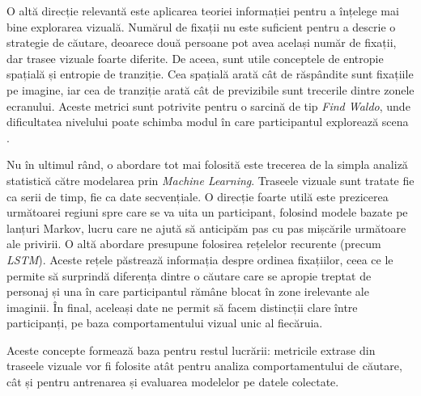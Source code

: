 O altă direcție relevantă este aplicarea teoriei informației pentru a înțelege mai bine explorarea vizuală. Numărul de fixații nu este suficient pentru a descrie o strategie de căutare, deoarece două persoane pot avea același număr de fixații, dar trasee vizuale foarte diferite. De aceea, sunt utile conceptele de entropie spațială și entropie de tranziție. Cea spațială arată cât de răspândite sunt fixațiile pe imagine, iar cea de tranziție arată cât de previzibile sunt trecerile dintre zonele ecranului. Aceste metrici sunt potrivite pentru o sarcină de tip \emph{Find Waldo}, unde dificultatea nivelului poate schimba modul în care participantul explorează scena \cite{otero2016waldo}.

Nu în ultimul rând, o abordare tot mai folosită este trecerea de la simpla analiză statistică către modelarea prin \emph{Machine Learning}. Traseele vizuale sunt tratate fie ca serii de timp, fie ca date secvențiale. O direcție foarte utilă este prezicerea următoarei regiuni spre care se va uita un participant, folosind modele bazate pe lanțuri Markov, lucru care ne ajută să anticipăm pas cu pas mișcările următoare ale privirii. O altă abordare presupune folosirea rețelelor recurente (precum \emph{LSTM}). Aceste rețele păstrează informația despre ordinea fixațiilor, ceea ce le permite să surprindă diferența dintre o căutare care se apropie treptat de personaj și una în care participantul rămâne blocat în zone irelevante ale imaginii. În final, aceleași date ne permit să facem distincții clare între participanți, pe baza comportamentului vizual unic al fiecăruia.

Aceste concepte formează baza pentru restul lucrării: metricile extrase din traseele vizuale vor fi folosite atât pentru analiza comportamentului de căutare, cât și pentru antrenarea și evaluarea modelelor pe datele colectate.